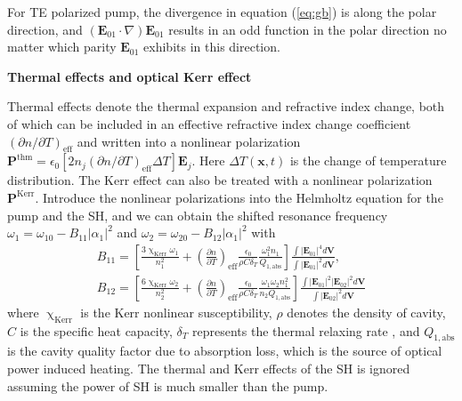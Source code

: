 \documentclass[a4paper,8pt,hyperref, aps, prl]{article}
\begin{document}
For TE polarized pump, the divergence in equation (\ref{eq:gb}) is along the polar direction, and $(\mathbf{E}_{01}\cdot\nabla)\mathbf{E}_{01}$ results in an odd function in the polar direction no matter which parity $\mathbf{E}_{01}$ exhibits in this direction.


\textbf{Thermal effects and optical Kerr effect}

Thermal effects denote the thermal expansion and refractive index change, both of which can be included in an effective refractive index change coefficient $({\partial n}/{\partial T})_{\mathrm{eff}}$ \cite{carmon2004dynamical} and written into a nonlinear polarization $\mathbf{P}^{\mathrm{thm}} = \epsilon_0[2n_j(\partial n/{\partial T})_\mathrm{eff}\Delta T]\mathbf{E}_j$. Here $\Delta T (\mathbf{x},t)$ is the change of temperature distribution. The Kerr effect can also be treated with a nonlinear polarization $\mathbf{P}^{\mathrm{Kerr}}$. Introduce the nonlinear polarizations into  the Helmholtz equation for the pump and the SH, and we can obtain the shifted resonance frequency $\omega_1 =\omega_{10} -B_{11}|\alpha_1|^2$ and $\omega_2 =\omega_{20} -B_{12}|\alpha_1|^2$ with 
\begin{gather}
\label{eq:B11}
B_{11} = [\frac{3\upchi_{\mathrm{Kerr}}\omega_1}{n_1^2}+(\frac{\partial n}{\partial T})_{\mathrm{eff} }\frac{\epsilon_0}{\rho C \delta_{T}}\frac{\omega_1^2n_1}{Q_{1,\mathrm{abs}}}]\frac{\int|\mathbf{E}_{01}|^4d\mathbf{V}}{\int|\mathbf{E}_{01}|^2d\mathbf{V}}, \\
B_{12} = [\frac{6\upchi_{\mathrm{Kerr}}\omega_2}{n_2^2}+(\frac{\partial n}{\partial T})_{\mathrm{eff} }\frac{\epsilon_0}{\rho C \delta_{T}}\frac{\omega_1\omega_2n_1^2}{n_2Q_{1,\mathrm{abs}}}]\frac{\int|\mathbf{E}_{01}|^2|\mathbf{E}_{02}|^2d\mathbf{V}}{\int|\mathbf{E}_{02}|^2d\mathbf{V}}
\label{eq:B12}
\end{gather}
where $\upchi_{\mathrm{Kerr}}$ is the Kerr nonlinear susceptibility, $\rho$ denotes the density of cavity, $C$ is the specific heat capacity, $\delta_{T}$ represents the thermal relaxing rate \cite{fomin2005nonstationary}, and $Q_{1,\mathrm{abs}}$ is the cavity quality factor due to absorption loss, which is the source of optical power induced heating. The thermal and Kerr effects of the SH is ignored assuming the power of SH is much smaller than the pump.
\end{document}
